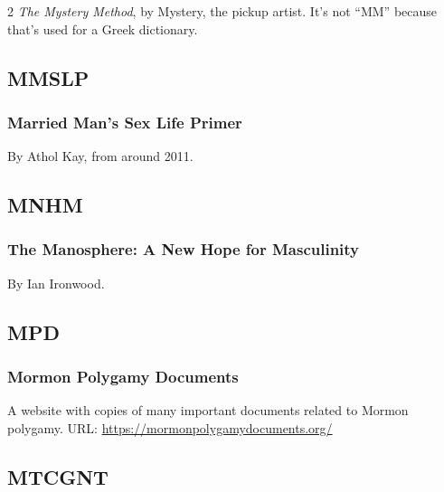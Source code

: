 \begin{multicols}{2}
			\textit{The Mystery Method}, by Mystery, the pickup artist. It's not ``MM'' because that's used for a Greek dictionary.
			
	\subsection*{MMSLP}
	
		\subsubsection*{Married Man's Sex Life Primer}
		
			By Athol Kay, from around 2011.
			
	\subsection*{MNHM}
	
		\subsubsection*{The Manosphere: A New Hope for Masculinity}
		
			By Ian Ironwood.
			
	\subsection*{MPD}
	
		\subsubsection*{Mormon Polygamy Documents}
		
			A website with copies of many important documents related to Mormon polygamy. URL: \href{https://mormonpolygamydocuments.org/}{https://mormonpolygamydocuments.org/}
			
	\subsection*{MTCGNT}
	

\end{multicols}
